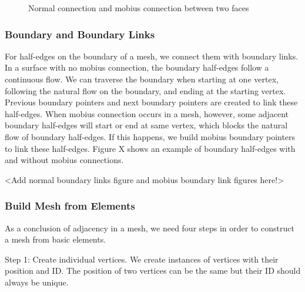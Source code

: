 \documentclass[12pt]{article}
\begin{document}
\begin{figure}[ht]
  \caption{Normal connection and mobius connection between two faces}
  \label{figure:faceConnections}
\end{figure}

\subsubsection{Boundary and Boundary Links}

For half-edges on the boundary of a mesh, we connect them with boundary links. In a surface with no mobius connection, the boundary half-edges follow a continuous flow. We can traverse the boundary when starting at one vertex, following the natural flow on the boundary, and ending at the starting vertex. Previous boundary pointers and next boundary pointers are created to link these half-edges. When mobius connection occurs in a mesh, however, some adjacent boundary half-edges will start or end at same vertex, which blocks the natural flow of boundary half-edges. If this happens, we build mobius boundary pointers to link these half-edges. Figure X shows an example of boundary half-edges with and without mobius connections.

<Add normal boundary links figure and mobius boundary link figures here!>

\subsubsection{Build Mesh from Elements}

As a conclusion of adjacency in a mesh, we need four steps in order to construct a mesh from basic elements.

Step 1: Create individual vertices. We create instances of vertices with their position and ID. The position of two vertices can be the same but their ID should always be unique. 
\end{document}
